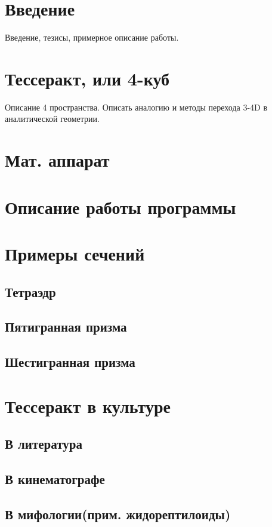 \documentclass[12pt, a4paper, towside]{report}
\begin{document}

\tableofcontents

\section{Введение}
Введение, тезисы, примерное описание работы.
\section{Тессеракт, или 4-куб}
Описание 4 пространства. Описать аналогию и методы перехода 3-4D в аналитической геометрии.
\section{Мат. аппарат}

\section{Описание работы программы}
\section{Примеры сечений}
\subsection{Тетраэдр}

\subsection{Пятигранная призма}
\subsection{Шестигранная призма}

\section{Тессеракт в культуре}
\subsection{В литература}
\subsection{В кинематографе}
\subsection{В мифологии(прим. жидорептилоиды)}
\end{document}
